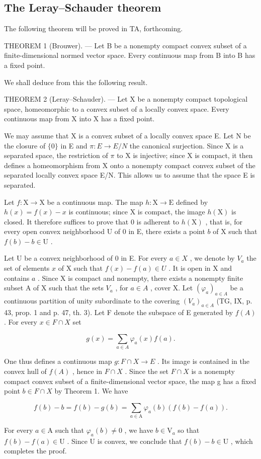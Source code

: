 \subsection{The Leray--Schauder theorem}

The following theorem will be proved in TA, forthcoming.

THEOREM 1 (Brouwer). --- Let B be a nonempty compact convex subset of a finite-dimensional normed vector space. Every continuous map from B into B has a fixed point.

We shall deduce from this the following result.

THEOREM 2 (Leray--Schauder). --- Let X be a nonempty compact topological space, homeomorphic to a convex subset of a locally convex space. Every continuous map from X into X has a fixed point.

We may assume that X is a convex subset of a locally convex space E. Let N be the closure of \(\{0\}\) in E and \(\pi: E \rightarrow E/N\) the canonical surjection. Since X is a separated space, the restriction of \(\pi\) to X is injective; since X is compact, it then defines a homeomorphism from X onto a nonempty compact convex subset of the separated locally convex space E/N. This allows us to assume that the space E is separated.

Let \(f: \mathrm{X} \to \mathrm{X}\) be a continuous map. The map \(h: \mathrm{X} \to \mathrm{E}\) defined by \(h(x) = f(x) - x\) is continuous; since X is compact, the image \(h(\mathrm{X})\) is closed. It therefore suffices to prove that 0 is adherent to \(h(\mathrm{X})\) , that is, for every open convex neighborhood U of 0 in E, there exists a point \(b\) of X such that \(f(b) - b \in \mathrm{U}\) .

Let U be a convex neighborhood of 0 in E. For every \(a \in X\) , we denote by \(V_a\) the set of elements \(x\) of X such that \(f(x) - f(a) \in U\) . It is open in X and contains \(a\) . Since X is compact and nonempty, there exists a nonempty finite subset A of X such that the sets \(V_a\) , for \(a \in A\) , cover X. Let \((\varphi_a)_{a \in A}\) be a continuous partition of unity subordinate to the covering \((V_a)_{a \in A}\) (TG, IX, p. 43, prop. 1 and p. 47, th. 3). Let F denote the subspace of E generated by \(f(A)\) . For every \(x \in F \cap X\) set

\[
g (x) = \sum_ {a \in A} \varphi_ {a} (x) f (a).
\]

One thus defines a continuous map \(g: F \cap X \to E\) . Its image is contained in the convex hull of \(f(A)\) , hence in \(F \cap X\) . Since the set \(F \cap X\) is a nonempty compact convex subset of a finite-dimensional vector space, the map g has a fixed point \(b \in F \cap X\) by Theorem 1. We have

\[
f (b) - b = f (b) - g (b) = \sum_ {a \in \mathrm{A}} \varphi_ {a} (b) (f (b) - f (a)).
\]

For every \(a \in \mathrm{A}\) such that \(\varphi_{a}(b) \neq 0\) , we have \(b \in \mathrm{V}_{a}\) so that \(f(b) - f(a) \in \mathrm{U}\) . Since U is convex, we conclude that \(f(b) - b \in \mathrm{U}\) , which completes the proof.

